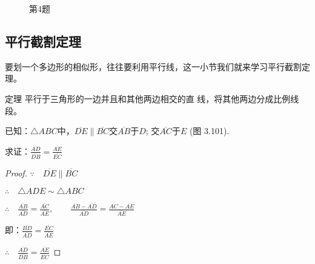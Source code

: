 \begin{figure}
\begin{tikzpicture}
\end{tikzpicture}
    \caption*{第4题}
\end{figure}

\subsection{平行截割定理}
要划一个多边形的相似形，往往要利用平行线，这一小节我们就来学习平行截割定理。

\begin{Theorem}{定理} 
平行于三角形的一边并且和其他两边相交的直
线，将其他两边分成比例线段。
\end{Theorem}

已知：$\triangle ABC$中，$\overline{DE}\parallel \overline{BC}$交$\overline{AB}$于$D$; 交$\overline{AC}$于$E$ (图
3.101).

求证：$\frac{\overline{AD}}{\overline{DB}}=\frac{\overline{AE}}{\overline{EC}}$

\begin{proof}
$\because\quad  \overline{DE}\parallel \overline{BC}$

$\therefore\quad \triangle ADE\sim \triangle ABC$

$\therefore\quad \frac{\overline{AB}}{\overline{AD}}=\frac{\overline{AC}}{\overline{AE}},\qquad \frac{\overline{AB}-\overline{AD}}{\overline{AD}}=\frac{\overline{AC}-\overline{AE}}{\overline{AE}}$

即：$\frac{\overline{BD}}{\overline{AD}}=\frac{\overline{EC}}{\overline{AE}}$

$\therefore\quad \frac{\overline{AD}}{\overline{DB}}=\frac{\overline{AE}}{\overline{EC}}$
\end{proof}

